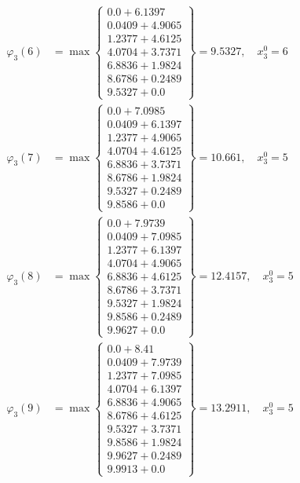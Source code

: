 \documentclass{article}
\begin{document}
\begin{align*}
  
  
  
\varphi_{3}(6) &= \max \left\{ \begin{array}{c}
0.0 + 6.1397 \\
 0.0409 + 4.9065 \\
 1.2377 + 4.6125 \\
 4.0704 + 3.7371 \\
 6.8836 + 1.9824 \\
 8.6786 + 0.2489 \\
 9.5327 + 0.0
\end{array} \right\}=9.5327,\quad x_{3}^0=6\\
  
  
  
  
\varphi_{3}(7) &= \max \left\{ \begin{array}{c}
0.0 + 7.0985 \\
 0.0409 + 6.1397 \\
 1.2377 + 4.9065 \\
 4.0704 + 4.6125 \\
 6.8836 + 3.7371 \\
 8.6786 + 1.9824 \\
 9.5327 + 0.2489 \\
 9.8586 + 0.0
\end{array} \right\}=10.661,\quad x_{3}^0=5\\
  
  
  
  
\varphi_{3}(8) &= \max \left\{ \begin{array}{c}
0.0 + 7.9739 \\
 0.0409 + 7.0985 \\
 1.2377 + 6.1397 \\
 4.0704 + 4.9065 \\
 6.8836 + 4.6125 \\
 8.6786 + 3.7371 \\
 9.5327 + 1.9824 \\
 9.8586 + 0.2489 \\
 9.9627 + 0.0
\end{array} \right\}=12.4157,\quad x_{3}^0=5\\
  
  
  
  
\varphi_{3}(9) &= \max \left\{ \begin{array}{c}
0.0 + 8.41 \\
 0.0409 + 7.9739 \\
 1.2377 + 7.0985 \\
 4.0704 + 6.1397 \\
 6.8836 + 4.9065 \\
 8.6786 + 4.6125 \\
 9.5327 + 3.7371 \\
 9.8586 + 1.9824 \\
 9.9627 + 0.2489 \\
 9.9913 + 0.0
\end{array} \right\}=13.2911,\quad x_{3}^0=5\\
  

\end{align*}
\end{document}
